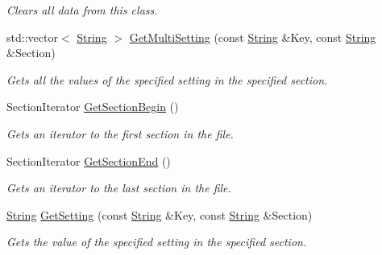 \begin{DoxyCompactItemize}
\begin{DoxyCompactList}\small\item\em Clears all data from this class. \item\end{DoxyCompactList}\item 
std::vector$<$ \hyperlink{namespaceMezzanine_acf9fcc130e6ebf08e3d8491aebcf1c86}{String} $>$ \hyperlink{classMezzanine_1_1Resource_1_1TextSettingsFile_a397e8267a6f5a3aa4177c944c2dc4fc9}{GetMultiSetting} (const \hyperlink{namespaceMezzanine_acf9fcc130e6ebf08e3d8491aebcf1c86}{String} \&Key, const \hyperlink{namespaceMezzanine_acf9fcc130e6ebf08e3d8491aebcf1c86}{String} \&Section)
\begin{DoxyCompactList}\small\item\em Gets all the values of the specified setting in the specified section. \item\end{DoxyCompactList}\item 
SectionIterator \hyperlink{classMezzanine_1_1Resource_1_1TextSettingsFile_aff6329d67f5a405eab6b92f987d76158}{GetSectionBegin} ()
\begin{DoxyCompactList}\small\item\em Gets an iterator to the first section in the file. \item\end{DoxyCompactList}\item 
SectionIterator \hyperlink{classMezzanine_1_1Resource_1_1TextSettingsFile_acd6aa009c17194fcf96caaf4aba44991}{GetSectionEnd} ()
\begin{DoxyCompactList}\small\item\em Gets an iterator to the last section in the file. \item\end{DoxyCompactList}\item 
\hyperlink{namespaceMezzanine_acf9fcc130e6ebf08e3d8491aebcf1c86}{String} \hyperlink{classMezzanine_1_1Resource_1_1TextSettingsFile_a17dc824a46dd09030fe04eabf7349a1a}{GetSetting} (const \hyperlink{namespaceMezzanine_acf9fcc130e6ebf08e3d8491aebcf1c86}{String} \&Key, const \hyperlink{namespaceMezzanine_acf9fcc130e6ebf08e3d8491aebcf1c86}{String} \&Section)
\begin{DoxyCompactList}\small\item\em Gets the value of the specified setting in the specified section. \item\end{DoxyCompactList}\item 

\end{DoxyCompactItemize}
